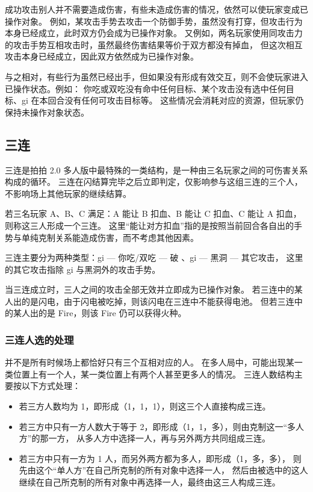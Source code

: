 \documentclass[12pt]{ctexart}
\begin{document}
成功攻击别人并不需要造成伤害，有些未造成伤害的情况，依然可以使玩家变成已操作对象。
例如，某攻击手势去攻击一个防御手势，虽然没有打穿，但攻击行为本身已经成立，此时双方仍会成为已操作对象。
又例如，两名玩家使用同攻击力的攻击手势互相攻击时，虽然最终伤害结果等价于双方都没有掉血，
但这次相互攻击本身已经成立，因此双方依然成为已操作对象。

与之相对，有些行为虽然已经出手，但如果没有形成有效交互，则不会使玩家进入已操作状态。例如：
你吃或双吃没有命中任何目标、某个攻击没有选中任何目标、gi 在本回合没有任何可攻击目标等。
这些情况会消耗对应的资源，但玩家仍保持未操作对象状态。

\subsection{三连}

三连是拍拍 2.0 多人版中最特殊的一类结构，是一种由三名玩家之间的可伤害关系构成的循环。
三连在闪结算完毕之后立即判定，仅影响参与这组三连的三个人，不影响场上其他玩家的继续结算。

若三名玩家 A、B、C 满足：A 能让 B 扣血、B 能让 C 扣血、C 能让 A 扣血，则称这三人形成一个三连。
这里“能让对方扣血”指的是按照当前回合各自出的手势与单纯克制关系能造成伤害，而不考虑其他因素。

三连主要分为两种类型：gi — 你吃/双吃 — 破 、gi — 黑洞 — 其它攻击，
这里的其它攻击指除 gi 与黑洞外的攻击手势。

当三连成立时，三人之间的攻击全部无效并立即成为已操作对象。
若三连中的某人出的是闪电，由于闪电被吃掉，则该闪电在三连中不能获得电池。
但若三连中的某人出的是 Fire，则该 Fire 仍可以获得火种。

\subsubsection{三连人选的处理}

并不是所有时候场上都恰好只有三个互相对应的人。
在多人局中，可能出现某一类位置上有一个人，某一类位置上有两个人甚至更多人的情况。
三连人数结构主要按以下方式处理：

\begin{itemize}
    \item 若三方人数均为 1，即形成（1，1，1），则这三个人直接构成三连。
    \item 若三方中只有一方人数大于等于 2，即形成（1，1，多），则由克制这一“多人方”的那一方，
    从多人方中选择一人，再与另外两方共同组成三连。
    \item 若三方中只有一方为 1 人，而另外两方都为多人，即形成（1，多，多），
    则先由这个“单人方”在自己所克制的所有对象中选择一人，
    然后由被选中的这人继续在自己所克制的所有对象中再选择一人，最终由这三人构成三连。
\end{itemize}
\end{document}
